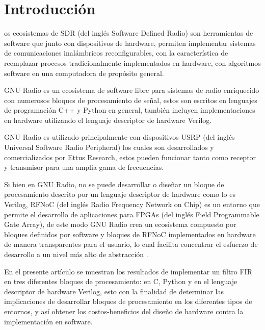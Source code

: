 \documentclass[12pt]{difu100cia} %
\begin{document}

\section{Introducción}
os ecosistemas de SDR (del inglés Software Defined Radio) son herramientas de software que junto con dispositivos de hardware, permiten implementar sistemas de comunicaciones inalámbricos reconfigurables, con la característica de reemplazar procesos tradicionalmente implementados en hardware, con algoritmos software en una computadora de propósito general. 

GNU Radio es un ecosistema de software libre para sistemas de radio enriquecido con numerosos bloques de procesamiento de señal, estos son escritos en lenguajes de programación C++ y Python en general, también incluyen implementaciones en hardware utilizando el lenguaje descriptor de hardware Verilog. 

GNU Radio es utilizado principalmente con dispositivos USRP (del inglés Universal Software Radio Peripheral) los cuales son desarrollados y comercializados por Ettus Research, estos pueden funcionar tanto como receptor y transmisor para una amplia gama de frecuencias. 

Si bien en GNU Radio, no se puede desarrollar o diseñar un bloque de procesamiento descrito por un lenguaje descriptor de hardware como lo es Verilog, RFNoC (del inglés Radio Frequency Network on Chip) es un entorno que permite el desarrollo de aplicaciones para FPGAs (del inglés Field Programmable Gate Array), de este modo GNU Radio crea un ecosistema compuesto por bloques definidos por software y bloques de RFNoC implementados en hardware de manera transparentes para el usuario, lo cual facilita concentrar el esfuerzo de desarrollo a un nivel más alto de abstracción \cite{guerrieri2017designing}. 

En el presente artículo se muestran los resultados de implementar un filtro FIR en tres diferentes bloques de procesamiento: en C, Python y en el lenguaje descriptor de hardware Verilog, esto con la finalidad de determinar las implicaciones de desarrollar bloques de procesamiento en los diferentes tipos de entornos, y así obtener los costos-beneficios del diseño de hardware contra la implementación en software.
\end{document}
